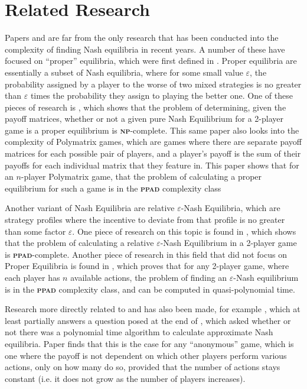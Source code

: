 \documentclass{article}
\begin{document}
\section{Related Research}
Papers \cite{Daskalakis.2009} and \cite{Fabrikant.2004} are far from the only research that has been conducted into the complexity of finding Nash equilibria in recent years. A number of these have focused on ``proper'' equilibria, which were first defined in \cite{MyersonR.B..1978}. Proper equilibria are essentially a subset of Nash equilibria, where for some small value $\varepsilon$, the probability assigned by a player to the worse of two mixed strategies is no greater than $\varepsilon$ times the probability they assign to playing the better one. One of these pieces of research is \cite{HansenKristofferArnsfelt.2018}, which shows that the problem of determining, given the payoff matrices, whether or not a given pure Nash Equilibrium for a 2-player game is a proper equilibrium is \textbf{\textsc{np}}-complete. This same paper also looks into the complexity of Polymatrix games, which are games where there are separate payoff matrices for each possible pair of players, and a player's payoff is the sum of their payoffs for each individual matrix that they feature in. This paper shows that for an $n$-player Polymatrix game, that the problem of calculating a proper equilibrium for such a game is in the \textbf{\textsc{ppad}} complexity class

Another variant of Nash Equilibria are relative $\varepsilon$-Nash Equilibria, which are strategy profiles where the incentive to deviate from that profile is no greater than some factor $\varepsilon$. One piece of research on this topic is found in \cite{Daskalakis.2013}, which shows that the problem of calculating a relative $\varepsilon$-Nash Equilibrium in a 2-player game is \textbf{\textsc{ppad}}-complete. Another piece of research in this field that did not focus on Proper Equilibria is found in \cite{rubinstein2016settling}, which proves that for any 2-player game, where each player has $n$ available actions, the problem of finding an $\varepsilon$-Nash equilibrium is in the \textbf{\textsc{ppad}} complexity class, and can be computed in quasi-polynomial time.

Research more directly related to \cite{Daskalakis.2009} and \cite{Fabrikant.2004} has also been made, for example \cite{Daskalakis.2015}, which at least partially answers a question posed at the end of \cite{Daskalakis.2009}, which asked whether or not there was a polynomial time algorithm to calculate approximate Nash equilibria. Paper \cite{Daskalakis.2015} finds that this is the case for any ``anonymous'' game, which is one where the payoff is not dependent on which other players perform various actions, only on how many do so, provided that the number of actions stays constant (i.e. it does not grow as the number of players increases).
\end{document}
